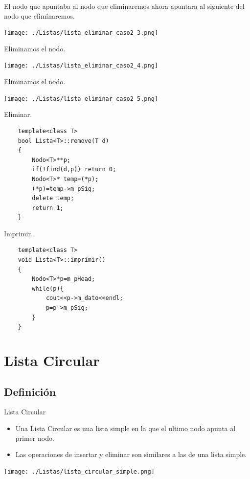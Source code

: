 \documentclass{beamer}
\begin{document}
\begin{frame}
  El nodo que apuntaba al nodo que eliminaremos ahora apuntara al siguiente del nodo que eliminaremos.
  
  \texttt{[image: ./Listas/lista\_eliminar\_caso2\_3.png]}
\end{frame}

\begin{frame}
  Eliminamos el nodo.
  
  \texttt{[image: ./Listas/lista\_eliminar\_caso2\_4.png]}
\end{frame}

\begin{frame}
  Eliminamos el nodo.
  
  \texttt{[image: ./Listas/lista\_eliminar\_caso2\_5.png]}
\end{frame}


\begin{frame}[fragile]
  Eliminar.
  \begin{verbatim}
    template<class T>
    bool Lista<T>::remove(T d)
    {
        Nodo<T>**p;
        if(!find(d,p)) return 0;
        Nodo<T>* temp=(*p);
        (*p)=temp->m_pSig;
        delete temp;
        return 1;
    }

  \end{verbatim}
\end{frame}


\begin{frame}[fragile]
  Imprimir.
  \begin{verbatim}
    template<class T>
    void Lista<T>::imprimir()
    {
        Nodo<T>*p=m_pHead;
        while(p){
            cout<<p->m_dato<<endl;
            p=p->m_pSig;
        }
    }

  \end{verbatim}
\end{frame}


\section{Lista Circular}

\subsection{Definición}

\begin{frame}
Lista Circular \\
  \begin{itemize}
  
  \item Una Lista Circular es una lista simple en la que el ultimo nodo apunta al primer nodo.
  \item Las operaciones de insertar y eliminar son similares a las de una lista simple. 
  \end{itemize}
  \texttt{[image: ./Listas/lista\_circular\_simple.png]}
\end{frame}
\end{document}
